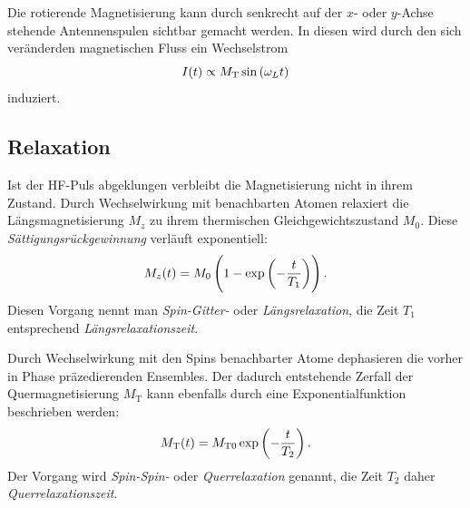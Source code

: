 \documentclass[
    11pt,
    ngerman
]{scrreprt}
\begin{document}
Die rotierende Magnetisierung kann durch senkrecht auf der $x$- oder $y$-Achse stehende Antennenspulen sichtbar gemacht werden. In diesen wird durch den sich veränderden magnetischen Fluss ein Wechselstrom
\[
    I(t) \propto M_\text{T} \sin\left({\omega_L t}\right)
\]
induziert.





\subsection{Relaxation}

Ist der HF-Puls abgeklungen verbleibt die Magnetisierung nicht in ihrem
Zustand. Durch Wechselwirkung mit benachbarten Atomen relaxiert die Längsmagnetisierung $M_z$ zu ihrem
thermischen Gleichgewichtszustand $M_0$. Diese \emph{Sättigungsrückgewinnung} verläuft exponentiell:
\[
    M_z(t) = M_0\del{1-\dexp{-\frac{t}{T_1}}}.
\]
Diesen Vorgang nennt man \emph{Spin-Gitter-} oder \emph{Längsrelaxation}, die
Zeit $T_1$ entsprechend \emph{Längsrelaxationszeit}.

Durch Wechselwirkung mit den Spins benachbarter Atome dephasieren die vorher in
Phase präzedierenden Ensembles. Der dadurch entstehende Zerfall der
Quermagnetisierung $M_\text{T}$ kann ebenfalls durch eine Exponentialfunktion
beschrieben werden:
\[
    M_\text{T}(t) = M_{\text{T}0}\exp\left({-\frac{t}{T_2}}\right).
\]
Der Vorgang wird \emph{Spin-Spin-} oder \emph{Querrelaxation} genannt, die Zeit $T_2$ daher \emph{Querrelaxationszeit}. 
\end{document}
